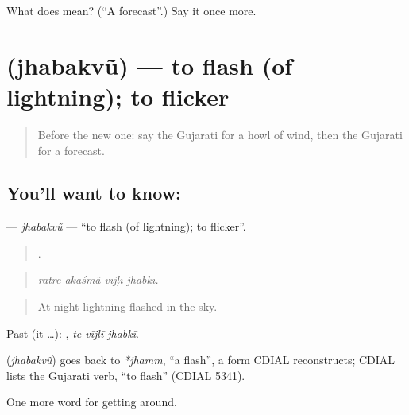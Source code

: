 \begin{tcolorbox}[breakable,colback=teal!4,colframe=teal!35!black,title={Before you move on}]
What does  mean? (\textquotedblleft{}A forecast\textquotedblright{}.) Say it once more.
\end{tcolorbox}
\section[\texorpdfstring{\gu{ઝબકવું} (jhabakvũ)}{ઝબકવું (jhabakvũ)}]{ (jhabakvũ) — to flash (of lightning); to flicker}

\label{lesson:GU-C435-jhabakvu}



\begin{quote}
Before the new one: say the Gujarati for a howl of wind, then the Gujarati for a forecast.
\end{quote}

\subsection*{You'll want to know: }
\textbf{} — \emph{jhabakvũ} — \textquotedblleft{}to flash (of lightning); to flicker\textquotedblright{}.

\begin{quote}
   .
\end{quote}

\begin{quote}
\emph{rātre ākāśmā̃ vījḷī jhabkī.}
\end{quote}

\begin{quote}
At night lightning flashed in the sky.
\end{quote}

Past (it …):   , \emph{te vījḷī jhabkī}.

\begin{cousinweb}
\textbf{} (\emph{jhabakvũ}) goes back to \emph{*jhamm}, \textquotedblleft{}a flash\textquotedblright{}, a form CDIAL reconstructs; CDIAL lists the Gujarati verb, \textquotedblleft{}to flash\textquotedblright{} (CDIAL 5341).
\end{cousinweb}

\begin{grammarlens}[title={What you've built}]
One more word for getting around.
\end{grammarlens}

